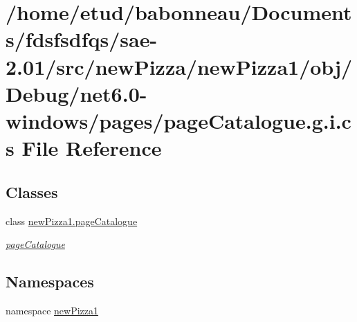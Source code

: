 \hypertarget{net6_80-windows_2pages_2pageCatalogue_8g_8i_8cs}{}\section{/home/etud/babonneau/\+Documents/fdsfsdfqs/sae-\/2.01/src/new\+Pizza/new\+Pizza1/obj/\+Debug/net6.0-\/windows/pages/page\+Catalogue.g.\+i.\+cs File Reference}
\label{net6_80-windows_2pages_2pageCatalogue_8g_8i_8cs}
\subsection*{Classes}
\begin{DoxyCompactItemize}
\item 
class \hyperlink{classnewPizza1_1_1pageCatalogue}{new\+Pizza1.\+page\+Catalogue}
\begin{DoxyCompactList}\small\item\em \hyperlink{classnewPizza1_1_1pageCatalogue}{page\+Catalogue} \end{DoxyCompactList}\end{DoxyCompactItemize}
\subsection*{Namespaces}
\begin{DoxyCompactItemize}
\item 
namespace \hyperlink{namespacenewPizza1}{new\+Pizza1}
\end{DoxyCompactItemize}
